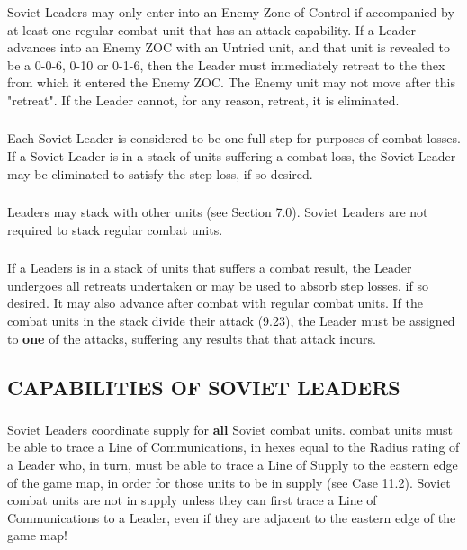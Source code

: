 \subsubsection{} Soviet Leaders may only enter into an Enemy Zone of Control if accompanied by at least one regular combat unit that has an attack capability. If a Leader advances into an Enemy ZOC with an Untried unit, and that unit is revealed to be a 0-0-6, 0-10 or 0-1-6, then the Leader must immediately retreat to the thex from which it entered the Enemy ZOC. The Enemy unit may not move after this "retreat". If the Leader cannot, for any reason, retreat, it is eliminated.

\subsubsection{} Each Soviet Leader is considered to be one full step for purposes of combat losses. If a Soviet Leader is in a stack of units suffering a combat loss, the Soviet Leader may be eliminated to satisfy the step loss, if so desired.

\subsubsection{} Leaders may stack with other units (see Section 7.0). Soviet Leaders are not required to stack regular combat units.

\subsubsection{} If a Leaders is in a stack of units that suffers a combat result, the Leader undergoes all retreats undertaken or may be used to absorb step losses, if so desired. It may also advance after combat with regular combat units. If the combat units in the stack divide their attack (9.23), the Leader must be assigned to \textbf{one} of the attacks, suffering any results that that attack incurs.

\subsection{CAPABILITIES OF SOVIET LEADERS}

\subsubsection{} Soviet Leaders coordinate supply for \textbf{all} Soviet combat units. combat units must be able to trace a Line of Communications, in hexes equal to the Radius rating of a Leader who, in turn, must be able to trace a Line of Supply to the eastern edge of the game map, in order for those units to be in supply (see Case 11.2). Soviet combat units are not in supply unless they can first trace a Line of Communications to a Leader, even if they are adjacent to the eastern edge of the game map!

